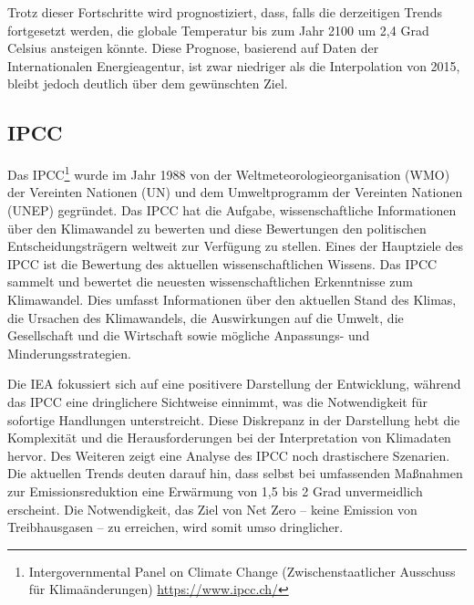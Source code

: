 \documentclass{article}
\begin{document}
Trotz dieser Fortschritte wird prognostiziert, dass, falls die derzeitigen Trends fortgesetzt werden, die globale Temperatur bis zum Jahr 2100 um 2,4 Grad Celsius ansteigen könnte. Diese Prognose, basierend auf Daten der Internationalen Energieagentur, ist zwar niedriger als die Interpolation von 2015, bleibt jedoch deutlich über dem gewünschten Ziel. 


 \subsection*{IPCC}
Das IPCC\footnote{%
         Intergovernmental Panel on Climate Change (Zwischenstaatlicher Ausschuss für Klimaänderungen)
				\href{https://www.ipcc.ch/}{https://www.ipcc.ch/}} 
wurde im Jahr 1988 von der Weltmeteorologieorganisation (WMO) der Vereinten Nationen (UN) und dem Umweltprogramm der Vereinten Nationen (UNEP) gegründet. Das IPCC hat die Aufgabe, wissenschaftliche Informationen über den Klimawandel zu bewerten und diese Bewertungen den politischen Entscheidungsträgern weltweit zur Verfügung zu stellen.
Eines der Hauptziele des IPCC ist die 
Bewertung des aktuellen wissenschaftlichen Wissens. Das IPCC sammelt und bewertet die neuesten wissenschaftlichen Erkenntnisse zum Klimawandel. Dies umfasst Informationen über den aktuellen Stand des Klimas, die Ursachen des Klimawandels, die Auswirkungen auf die Umwelt, die Gesellschaft und die Wirtschaft sowie mögliche Anpassungs- und Minderungsstrategien.



Die IEA fokussiert sich auf eine positivere Darstellung der Entwicklung, während das IPCC eine  dringlichere Sichtweise einnimmt, was die Notwendigkeit für sofortige Handlungen unterstreicht. Diese Diskrepanz in der Darstellung hebt die Komplexität und die Herausforderungen bei der Interpretation von Klimadaten hervor.
Des Weiteren zeigt eine Analyse des IPCC noch drastischere Szenarien. Die aktuellen Trends deuten darauf hin, dass selbst bei umfassenden Maßnahmen zur Emissionsreduktion eine Erwärmung von 1,5 bis 2 Grad unvermeidlich erscheint. Die Notwendigkeit, das Ziel von Net Zero – keine Emission von Treibhausgasen – zu erreichen, wird somit umso dringlicher.
\end{document}
